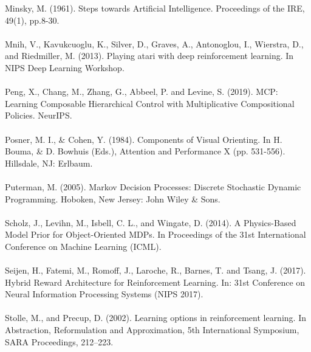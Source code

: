 \documentclass[notitlepage,a4paper,11pt]{article}
\begin{document}
Minsky, M. (1961). Steps towards Artificial Intelligence. Proceedings of the IRE, 49(1), pp.8-30.\\\\
Mnih, V., Kavukcuoglu, K., Silver, D., Graves, A., Antonoglou, I., Wierstra, D., and Riedmiller, M. (2013). Playing atari with deep reinforcement learning. In NIPS Deep Learning Workshop.\\\\
Peng, X., Chang, M., Zhang, G., Abbeel, P. and Levine, S. (2019). MCP: Learning Composable Hierarchical Control with Multiplicative Compositional Policies. NeurIPS.\\\\
Posner, M. I., \& Cohen, Y. (1984). Components of Visual Orienting. In H. Bouma, \& D. Bowhuis (Eds.), Attention and Performance X (pp. 531-556). Hillsdale, NJ: Erlbaum.\\\\
Puterman, M. (2005). Markov Decision Processes: Discrete Stochastic Dynamic Programming. Hoboken, New Jersey: John Wiley \& Sons.\\\\
Scholz, J., Levihn, M., Isbell, C. L., and Wingate, D. (2014).
A Physics-Based Model Prior for Object-Oriented MDPs.
In Proceedings of the 31st International Conference on Machine Learning (ICML).\\\\
Seijen, H., Fatemi, M., Romoff, J., Laroche, R., Barnes, T. and Tsang, J. (2017). Hybrid Reward Architecture for Reinforcement Learning. In: 31st Conference on Neural Information Processing Systems (NIPS 2017).\\\\
Stolle, M., and Precup, D. (2002). Learning options in reinforcement learning. In Abstraction, Reformulation and Approximation, 5th International Symposium, SARA Proceedings, 212–223.\\\\
\end{document}
